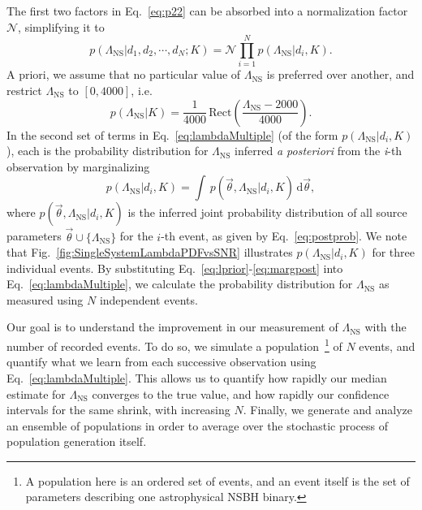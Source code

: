 \documentclass[aps,prd,amsmath,floats,floatfix, twocolumn,
superscriptaddress,nofootinbib,showpacs]{revtex4-1}
\newcommand{\D}{\mathrm{d}}
\newcommand{\lambdans}{\Lambda_\mathrm{NS}}
\begin{document}
% 
The first two factors in Eq.~\ref{eq:p22} can be absorbed into a
normalization factor $\mathcal{N}$, simplifying it to
% 
\begin{equation}\label{eq:lambdaMultiple}
 p(\lambdans | d_1, d_2, \cdots, d_N; K) = \mathcal{N}\prod_{i=1}^N p(\lambdans | d_i, K).
\end{equation}
% 
% 
A priori, we assume that no particular value of $\lambdans$ is preferred
over another, and restrict $\lambdans$ to $[0, 4000]$, i.e.
\begin{equation}\label{eq:lprior}
 p(\lambdans | K) = \dfrac{1}{4000}\,\mathrm{Rect}\left(\frac{\lambdans-2000}{4000}\right).
\end{equation}
% 
In the second set of terms in Eq.~\ref{eq:lambdaMultiple} (of the form 
$p(\lambdans | d_i, K)$), each is the probability distribution for $\lambdans$
inferred {\it a posteriori} from the \textit{i}-th observation by marginalizing
\begin{equation}\label{eq:margpost}
 p(\lambdans | d_i, K) = \int\, p(\vec{\theta}, \lambdans | d_i, K)\, \D \vec{\theta},
\end{equation}
where $p(\vec{\theta}, \lambdans | d_i, K)$ is the inferred joint probability 
distribution of all source parameters $\vec{\theta}\cup\{\lambdans\}$ for the 
$i$-th event, as given by Eq.~\ref{eq:postprob}. We note that 
Fig.~\ref{fig:SingleSystemLambdaPDFvsSNR} illustrates $p(\lambdans | d_i, K)$
for three individual events. By substituting
Eq.~\ref{eq:lprior}-\ref{eq:margpost} into Eq.~\ref{eq:lambdaMultiple}, we
calculate the probability distribution for $\lambdans$ as measured using $N$
independent events.




Our goal is to understand the improvement in our measurement of $\lambdans$
with the number of recorded events. To do so, we simulate a population~\footnote{%
A population here is an ordered set of events, and an event itself is the 
set of parameters describing one astrophysical NSBH binary.}
of $N$ events, and quantify what we learn from each successive observation 
using Eq.~\ref{eq:lambdaMultiple}. This allows us to quantify how
rapidly our median estimate for $\lambdans$ converges to the true value,
and how rapidly our confidence intervals for the same shrink, with increasing
$N$. Finally, we generate and analyze an ensemble of populations in order to
average over the stochastic process of population generation itself.
\end{document}
